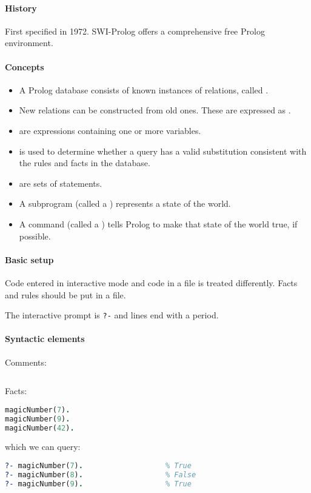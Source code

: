 \paragraph{History}
First specified in 1972. SWI-Prolog offers a comprehensive free Prolog environment.
\paragraph{Concepts}
\begin{itemize}
\item A Prolog database consists of known instances of relations, called .
\item New relations can be constructed from old ones. These are expressed as .
\item {} are expressions containing one or more variables.
\item {} is used to determine whether a query has a valid substitution consistent with the rules and facts in the database.
\item {} are sets of statements.
\end{itemize}

\begin{itemize}
\item A subprogram (called a ) represents a state of the world.
\item A command (called a ) tells Prolog to make that state of the world true, if possible.
\end{itemize}

\paragraph{Basic setup}
Code entered in interactive mode and code in a file is treated differently. Facts and rules should be put in a file.

The interactive prompt is \texttt{?-} and lines end with a period.


\paragraph{Syntactic elements}
Comments:
\begin{lstlisting}[language=prolog, style=snippet]
% This is a comment
\end{lstlisting}
Facts:
\begin{lstlisting}[language=prolog, style=snippet]
magicNumber(7).
magicNumber(9).
magicNumber(42).
\end{lstlisting}
which we can query:
\begin{lstlisting}[language=prolog, style=snippet]
?- magicNumber(7).                   % True
?- magicNumber(8).                   % False
?- magicNumber(9).                   % True
\end{lstlisting}

